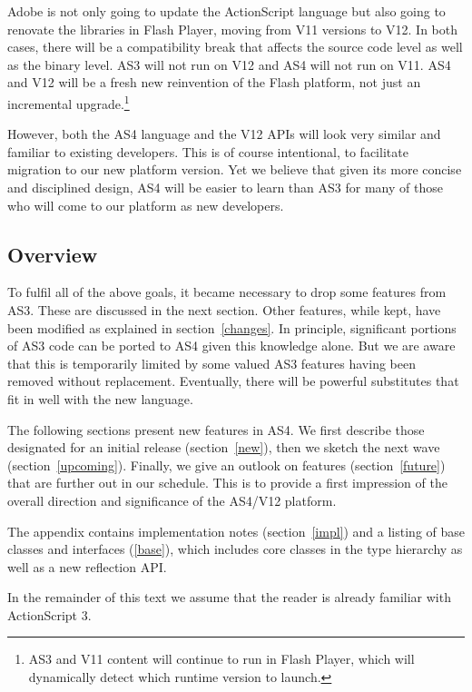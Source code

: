 Adobe is not only going to update the ActionScript language but also going
to renovate the libraries in Flash Player, moving from V11 versions to V12. In
both cases, there will be a compatibility break that affects the source code level as well as the binary level.
AS3 will not run on V12 and AS4 will not run on V11. AS4 and V12 will be a fresh new reinvention of the Flash
platform, not just an incremental upgrade.\footnote{AS3 and V11 content will continue to run in Flash Player, which will dynamically
detect which runtime version to launch.}

However, both the AS4 language and the V12 APIs will look very similar and familiar to existing developers.
This is of course intentional, to facilitate migration to our new platform version. Yet we believe that given its
more concise and disciplined design, AS4 will be easier to learn than AS3 for many of those who will come to our
platform as new developers.


\subsection{Overview}
To fulfil all of the above goals, it became necessary to drop some features from AS3. These are
discussed in the next section. Other features, while kept, have been modified as explained in
section~\ref{changes}. In principle, significant portions of AS3 code can be ported to AS4 given this knowledge alone.
But we are aware that this is temporarily limited by some valued AS3 features having been removed without replacement.
Eventually, there will be powerful substitutes that fit in well with the new language.

The following sections present new features in AS4. We first describe those designated for an initial release
(section~\ref{new}), then we sketch the next wave (section~\ref{upcoming}). Finally, we give an outlook on features
(section~\ref{future}) that are further out in our schedule. This is to provide a first impression of the overall
direction and significance of the AS4/V12 platform.

The appendix contains implementation notes (section~\ref{impl}) and a listing of base classes and interfaces
(\ref{base}), which includes core classes in the type hierarchy as well as a new reflection API.

In the remainder of this text we assume that the reader is already familiar with
ActionScript 3.
